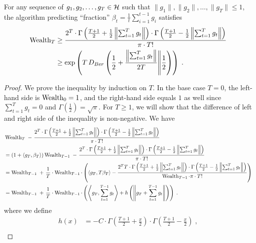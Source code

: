 \begin{theorem}
\label{theo:wealth}
For any sequence of $g_1, g_2, \dots, g_T \in \mathcal{H}$ such that $\|g_1\|, \|g_2\|,
\dots, \|g_T\| \le 1$, the algorithm predicting ``fraction'' $\beta_t =
\frac{1}{t} \sum_{i=1}^{t-1} g_i$ satisfies
\begin{align*}
\operatorname{Wealth}_T
&\geq \frac{2^T \cdot \Gamma \left(\frac{T+1}{2} + \frac{1}{2}\left\|\sum_{t=1}^T g_t \right\| \right) \cdot \Gamma \left(\frac{T+1}{2} - \frac{1}{2} \left\|\sum_{t=1}^T g_t \right\| \right)}{\pi \cdot T!} \\
&\geq \exp\left(T \, D_{Ber}\left(\frac{1}{2} +\frac{\left\|\sum_{t=1}^T g_t \right\|}{2T}\middle\| \frac{1}{2}\right)\right)
\; .
\end{align*}
\end{theorem}
%
\begin{proof}
We prove the inequality by induction on $T$. In the base case $T=0$, the
left-hand side is $\operatorname{Wealth}_0 = 1$, and the right-hand side equals $1$ as well
since $\sum_{t=1}^T g_t = 0$ and $\Gamma(\frac{1}{2}) = \sqrt{\pi}$. For $T \ge
1$, we will show that the difference of left and right side of the inequality is
non-negative. We have
\begin{align*}
& \operatorname{Wealth}_T \ - \ \frac{2^T \cdot \Gamma \left(\frac{T+1}{2} + \frac{1}{2}\left\|\sum_{t=1}^T g_t \right\| \right) \cdot \Gamma \left(\frac{T+1}{2} - \frac{1}{2} \left\|\sum_{t=1}^T g_t \right\| \right)}{\pi \cdot T!} \\
& = (1 + \langle g_T, \beta_T \rangle) \operatorname{Wealth}_{T-1} \ - \ \frac{2^T \cdot \Gamma \left(\frac{T+1}{2} + \frac{1}{2}\left\|\sum_{t=1}^T g_t \right\| \right) \cdot \Gamma \left(\frac{T+1}{2} - \frac{1}{2} \left\|\sum_{t=1}^T g_t \right\| \right)}{\pi \cdot T!} \\
& = \operatorname{Wealth}_{T-1} \ + \ \frac{1}{T} \cdot \operatorname{Wealth}_{T-1} \cdot \left(\langle g_T, T \beta_T \rangle - \frac{2^T T \cdot \Gamma \left(\frac{T+1}{2} + \frac{1}{2}\left\|\sum_{t=1}^T g_t \right\| \right) \cdot \Gamma \left(\frac{T+1}{2} - \frac{1}{2} \left\|\sum_{t=1}^T g_t \right\| \right)}{\operatorname{Wealth}_{T-1} \cdot \pi \cdot T!} \right) \\
& = \operatorname{Wealth}_{T-1} \ + \ \frac{1}{T} \cdot \operatorname{Wealth}_{T-1} \cdot \left( \left\langle g_T, \sum_{t=1}^{T-1} g_t \right\rangle + h\left( \left\|g_T + \sum_{t=1}^{T-1} g_t \right\| \right) \right) \; .
\end{align*}
where we define
\begin{align*}
h(x) & = - C \cdot \Gamma \left(\frac{T+1}{2} + \frac{x}{2} \right) \cdot \Gamma \left(\frac{T+1}{2} - \frac{x}{2} \right) \; ,  \\

\end{align*}
\end{proof}
